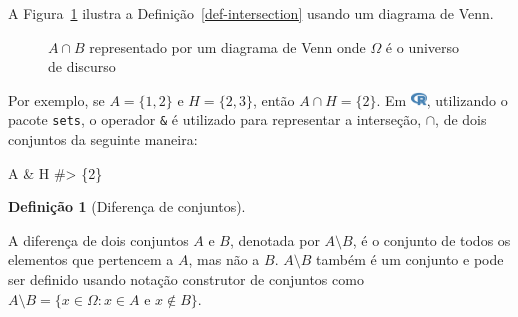 \documentclass[
  letterpaper,
]{book}
\newenvironment{Shaded}{\begin{snugshade}}{\end{snugshade}}
\newcommand{\CommentTok}[1]{\textcolor[rgb]{0.37,0.37,0.37}{#1}}
\newcommand{\NormalTok}[1]{\textcolor[rgb]{0.00,0.23,0.31}{#1}}
\newcommand{\SpecialCharTok}[1]{\textcolor[rgb]{0.37,0.37,0.37}{#1}}
\theoremstyle{definition}
\newtheorem{definition}{Definição}[chapter]
\theoremstyle{plain}
\theoremstyle{remark}
\begin{document}
A Figura~\ref{fig-intersection-venn-diagram} ilustra a
Definição~\ref{def-intersection} usando um diagrama de Venn.

\begin{figure}


\caption{\label{fig-intersection-venn-diagram}\(A \cap B\) representado
por um diagrama de Venn onde \(\Omega\) é o universo de discurso}

\end{figure}%

Por exemplo, se \(A = \{ 1, 2 \}\) e \(H = \{ 2, 3 \}\), então
\(A \cap H = \{ 2 \}\). Em
\includegraphics[width=1.13em,height=1em]{naive_set_theory_files/figure-pdf/fa-icon-9b00320707d42527dde67262afb33ded.pdf},
utilizando o pacote \texttt{sets}, o operador \texttt{\&} é utilizado
para representar a interseção, \(\cap\), de dois conjuntos da seguinte
maneira:

\begin{Shaded}
\begin{Highlighting}[]
\NormalTok{A }\SpecialCharTok{\&}\NormalTok{ H}
\CommentTok{\#\textgreater{} \{2\}}
\end{Highlighting}
\end{Shaded}

\begin{definition}[Diferença de
conjuntos]\protect\hypertarget{def-difference}{}\label{def-difference}

A diferença de dois conjuntos \(A\) e \(B\), denotada por
\(A \setminus B\), é o conjunto de todos os elementos que pertencem a
\(A\), mas não a \(B\). \(A \setminus B\) também é um conjunto e pode
ser definido usando notação construtor de conjuntos como
\(A \setminus B = \{ x \in \Omega : x \in A \text{ e } x \notin B \}\).

\end{definition}
\end{document}
